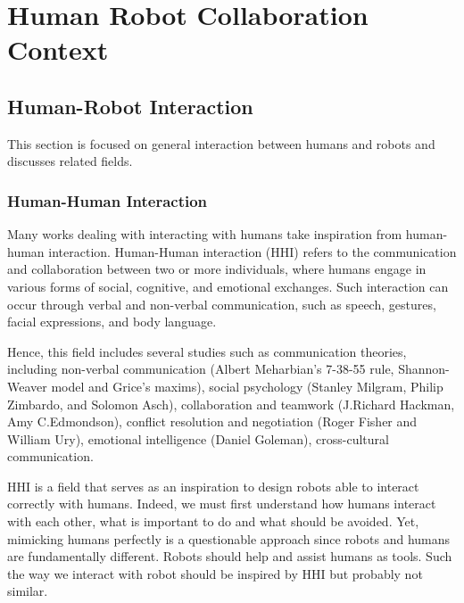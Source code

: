 \ifdefined{}
\else
\setcounter{chapter}{0}
\dominitoc
\faketableofcontents
\fi

\chapter{Human Robot Collaboration Context}
\label{chap:1}
\minitoc



\section{Human-Robot Interaction}

This section is focused on general interaction between humans and robots and discusses related fields.

\subsection{Human-Human Interaction}

Many works dealing with interacting with humans take inspiration from human-human interaction. Human-Human interaction (HHI) refers to the communication and collaboration between two or more individuals, where humans engage in various forms of social, cognitive, and emotional exchanges. Such interaction can occur through verbal and non-verbal communication, such as speech, gestures, facial expressions, and body language.

Hence, this field includes several studies such as communication theories, including non-verbal communication (Albert Meharbian's 7-38-55 rule, Shannon-Weaver model and Grice's maxims), social psychology (Stanley Milgram, Philip Zimbardo, and Solomon Asch), collaboration and teamwork (J.Richard Hackman, Amy C.Edmondson), conflict resolution and negotiation (Roger Fisher and William Ury), emotional intelligence (Daniel Goleman), cross-cultural communication.

HHI is a field that serves as an inspiration to design robots able to interact correctly with humans. Indeed, we must first understand how humans interact with each other, what is important to do and what should be avoided. Yet, mimicking humans perfectly is a questionable approach since robots and humans are fundamentally different. Robots should help and assist humans as tools. Such the way we interact with robot should be inspired by HHI but probably not similar.


